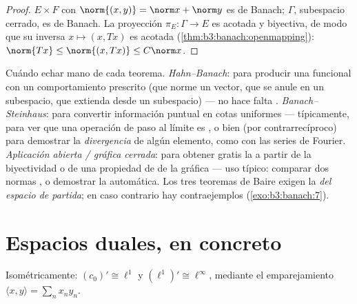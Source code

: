 \begin{proof}
$E \times F$ con $\norm{(x,y)} = \norm x + \norm y$ es de Banach;
$\Gamma$, subespacio cerrado, es de Banach. La proyección
$\pi_E\colon \Gamma \to E$ es acotada y biyectiva, de modo que su
inversa $x \mapsto (x, Tx)$ es acotada
(\cref{thm:b3:banach:openmapping}): $\norm{Tx} \leq \norm{(x,
Tx)} \leq C\norm x$.
\end{proof}

\begin{method}\label{met:b3:banach:trilogy}
Cuándo echar mano de cada teorema. \emph{Hahn--Banach}: para producir
una funcional con un comportamiento prescrito (que norme un vector, que
se anule en un subespacio, que extienda desde un subespacio) --- no hace
falta .
\emph{Banach--Steinhaus}: para convertir información puntual en cotas
uniformes --- típicamente, para ver que una operación de paso al límite
es , o bien (por
contrarrecíproco) para demostrar la \emph{divergencia} de algún
elemento, como con las series de Fourier. \emph{Aplicación abierta /
gráfica cerrada}: para obtener gratis la
 a partir de la
biyectividad  o de una
propiedad de  de la gráfica
--- uso típico: comparar dos normas
, o demostrar la
 automática. Los tres
teoremas de Baire exigen la
 \emph{del espacio de
partida}; en caso contrario hay contraejemplos
(\cref{exo:b3:banach:7}).
\end{method}

\section{Espacios duales, en concreto}

\begin{theorem}\label{thm:b3:banach:duals}
Isométricamente: $(c_0)' \cong \ell^1$ y $(\ell^1)' \cong
\ell^\infty$, mediante el emparejamiento $\langle x, y\rangle = \sum_n
x_ny_n$.
\end{theorem}


